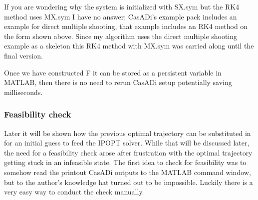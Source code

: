 If you are wondering why the system is initialized with SX.sym but the RK4 method uses MX.sym I have
no answer; CasADi's example pack includes an example for direct multiple shooting, that example includes an RK4 method on the form shown above.
Since my algorithm uses the direct multiple shooting example as a skeleton this RK4 method with MX.sym was carried along until the final version.

Once we have constructed F it can be stored as a persistent variable in MATLAB, then there is no need to rerun CasADi setup potentially saving
milliseconds.


\subsubsection*{Feasibility check}
Later it will be shown how the previous optimal trajectory can be substituted in for an initial guess to feed the \gls{IPOPT} solver. While
that will be discussed later, the need for a feasibility check arose after frustration with the optimal trajectory getting stuck in an
infeasible state. The first idea to check for feasibility was to somehow read the printout CasADi outputs to the MATLAB command window, 
but to the author's knowledge hat turned out to be impossible. Luckily there is a very easy way to conduct the check manually.

